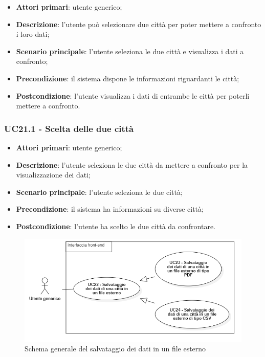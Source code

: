 \begin{itemize}
	\item \textbf{Attori primari}: utente generico;
	\item \textbf{Descrizione}: l’utente può selezionare due città per poter mettere a confronto i loro dati;
	\item \textbf{Scenario principale}: l’utente seleziona le due città e visualizza i dati a confronto;
	\item \textbf{Precondizione}: il sistema dispone le informazioni riguardanti le città;
	\item \textbf{Postcondizione}: l'utente visualizza i dati di entrambe le città per poterli mettere a confronto.
\end{itemize}

\subsubsection{UC21.1 - Scelta delle due città}
\begin{itemize}
	\item \textbf{Attori primari}: utente generico;
	\item \textbf{Descrizione}: l'utente seleziona le due città da mettere a confronto per la visualizzazione dei dati;
	\item \textbf{Scenario principale}: l’utente seleziona le due città;
	\item \textbf{Precondizione}: il sistema ha informazioni su diverse città;
	\item \textbf{Postcondizione}: l'utente ha scelto le due città da confrontare.
\end{itemize}


\begin{center}
	\begin{figure}[H]
		\centering\includegraphics[scale=0.7]{../immagini/attori_casi/UC_22_23_24.png}
		\caption{Schema generale del salvataggio dei dati in un file esterno}
	\end{figure}
\end{center}


